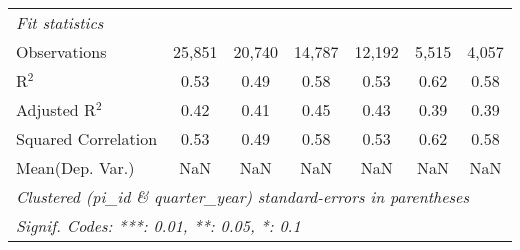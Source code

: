 \begin{tabular}{lcccccc}
   \midrule
   \emph{Fit statistics}\\
   Observations                                               & 25,851        & 20,740        & 14,787       & 12,192       & 5,515        & 4,057\\  
   R$^2$                                                      & 0.53          & 0.49          & 0.58         & 0.53         & 0.62         & 0.58\\  
   Adjusted R$^2$                                             & 0.42          & 0.41          & 0.45         & 0.43         & 0.39         & 0.39\\  
   Squared Correlation                                        & 0.53          & 0.49          & 0.58         & 0.53         & 0.62         & 0.58\\  
Mean(Dep. Var.) & NaN & NaN & NaN & NaN & NaN & NaN \\
   \midrule \midrule
   \multicolumn{7}{l}{\emph{Clustered (pi\_id \& quarter\_year) standard-errors in parentheses}}\\
   \multicolumn{7}{l}{\emph{Signif. Codes: ***: 0.01, **: 0.05, *: 0.1}}\\
\end{tabular}
\par\endgroup
